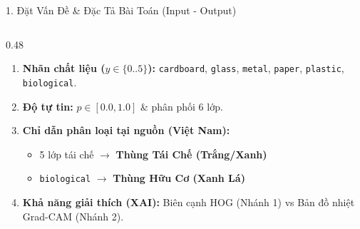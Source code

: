 \documentclass[aspectratio=169, 10pt]{beamer}
\begin{document}
\begin{frame}{1. Đặt Vấn Đề \& Đặc Tả Bài Toán (Input - Output)}
\begin{columns}[T]
  \begin{column}{0.48\textwidth}
    \begin{tcolorbox}[colback=white, colframe=GreenRecycle, title=\textbf{Output (Đầu ra)}]
      \begin{enumerate}
        \item \textbf{Nhãn chất liệu ($y \in \{0..5\}$):}
        \texttt{cardboard}, \texttt{glass}, \texttt{metal}, \texttt{paper}, \texttt{plastic}, \texttt{biological}.
        \item \textbf{Độ tự tin:} $p \in [0.0, 1.0]$ \& phân phối 6 lớp.
        \item \textbf{Chỉ dẫn phân loại tại nguồn (Việt Nam):}
        \begin{itemize}
          \item 5 lớp tái chế $\rightarrow$ \textcolor{BlueRecycle}{\textbf{Thùng Tái Chế (Trắng/Xanh)}}
          \item \texttt{biological} $\rightarrow$ \textcolor{GreenRecycle}{\textbf{Thùng Hữu Cơ (Xanh Lá)}}
        \end{itemize}
        \item \textbf{Khả năng giải thích (XAI):} Biên cạnh HOG (Nhánh 1) vs Bản đồ nhiệt Grad-CAM (Nhánh 2).
      \end{enumerate}
    \end{tcolorbox}
  \end{column}
\end{columns}
\end{frame}
\end{document}
